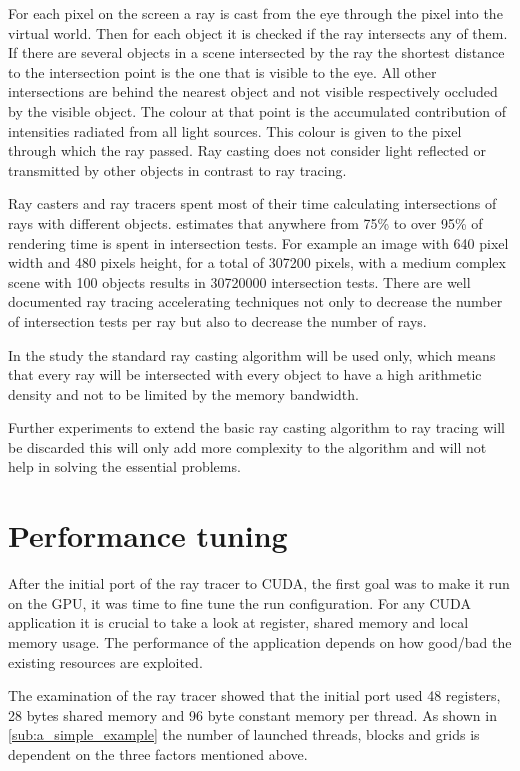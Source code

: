 For each pixel on the screen a ray is cast from the eye through the pixel into
the virtual world. Then for each object it is checked if the ray intersects any
of them. If there are several objects in a scene intersected by the ray the
shortest distance to the intersection point is the one that is visible to the
eye. All other intersections are behind the nearest object and not visible
respectively occluded by the visible object. The colour at that point is the
accumulated contribution of intensities radiated from all light sources. This
colour is given to the pixel through which the ray passed. Ray casting does not
consider light reflected or transmitted by other objects in contrast to ray
tracing.

Ray casters and ray tracers spent most of their time calculating intersections
of rays with different objects. \citeauthor{citeulike:3770900}
\citep{citeulike:3770900} estimates that anywhere from 75\% to over 95\% of
rendering time is spent in intersection tests. For example an image with 640
pixel width and 480 pixels height, for a total of 307200 pixels, with a medium
complex scene with 100 objects results in 30720000 intersection tests. There are
well documented ray tracing accelerating techniques not only to decrease the
number of intersection tests per ray but also to decrease the number of rays.

In the study the standard ray casting algorithm will be used only, which means
that every ray will be intersected with every object to have a high arithmetic
density and not to be limited by the memory bandwidth.

Further experiments to extend the basic ray casting algorithm to ray tracing 
will be discarded this will only add more complexity to the algorithm and will
not help in solving the essential problems. 

\section{Performance tuning} %
\label{sec:performance_tuning}

After the initial port of the ray tracer to \gls{CUDA}, the first goal was to 
make it run on the \gls{GPU}, it was time to fine tune the run configuration. 
For any \gls{CUDA} application it is crucial to take a look at register, shared 
memory and local memory usage. The performance of the application  depends on
how good/bad the existing resources are exploited.

The examination of the ray tracer showed that the initial port used 48
registers, 28 bytes shared memory and 96 byte constant memory per thread. As
shown in \autoref{sub:a_simple_example} the number of launched
threads, blocks and grids is dependent on the three factors mentioned above.

